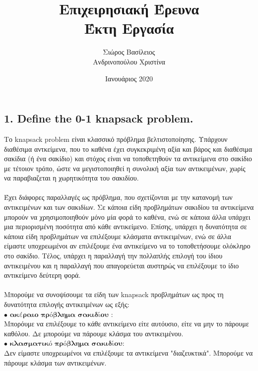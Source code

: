 \documentclass[12pt]{article}
\title{\hugeΑλγοριθμική Επιχειρησιακή Έρευνα\\Έκτη Εργασία}
\author{Σιώρος Βασίλειος\\Ανδρινοπούλου Χριστίνα}
\date{Ιανουάριος 2020}
\begin{document}
\maketitle


\pagebreak


\subsection*{1. Define the 0-1 knapsack problem.}

Το knapsack problem είναι κλασσικό πρόβλημα βελτιστοποίησης. Υπάρχουν διαθέσιμα αντκείμενα, που το καθένα έχει συγκεκριμένη αξία και βάρος και διαθέσιμα σακίδια (ή ένα σακίδιο) και στόχος είναι να τοποθετηθούν τα αντικείμενα στο σακίδιο με τέτοιον τρόπο, ώστε να μεγιστοποιηθεί η συνολική αξία των αντικειμένων, χωρίς να παραβιαζεται η χωρητικότητα του σακιδίου. \\ \\
 
Έχει διάφορες παραλλαγές ως πρόβλημα, που σχετίζονται με την κατανομή των αντικειμένων και των σακιδίων. Σε κάποια είδη προβλημάτων σακιδίου τα αντικείμενα μπορούν να χρησιμοποιηθούν μόνο μία φορά το καθένα, ενώ σε κάποια άλλα υπάρχει μια περιορισμένη ποσότητα από κάθε αντικείμενο. Επίσης, υπάρχει η δυνατότητα σε κάποια είδη προβλημάτων να επιλέξουμε κλάσματα αντικειμένων, ενώ σε άλλα είμαστε υποχρεωμένοι αν επιλέξουμε ένα αντικείμενο να το τοποθετήσουμε ολόκληρο στο σακίδιο. Τέλος, υπάρχει η παραλλαγή την πολλαπλής επιλογή του ίδιου αντικειμένου και η παραλλαγή που απαγορεύεται αυστηρώς να επιλέξουμε το ίδιο αντικείμενο δεύτερη φορά. \\  \\

Μπορούμε να συνοψίσουμε τα είδη των knapsack προβλημάτων ως προς τη δυνατότητα επιλογής αντικειμένων ως εξής: \\
\(\bullet\) \(\textbf{ακέραιο πρόβλημα σακιδίου}\) : \\ 
Μπορόυμε να επιλέξουμε το κάθε αντικείμενο είτε αυτόυσιο, είτε να μην το πάρουμε καθόλου. Δε μπορούμε να πάρουμε κλάσμα του αντικειμένου. \\
\(\bullet\) \(\textbf{κλασματικό πρόβλημα σακιδίου}\): \\
Δεν είμαστε υποχρεωμένοι να επιλέξουμε τα αντικείμενα "διαζευκτικά". Μπορούμε να πάρουμε κλάσμα των αντικειμένων. \\
\end{document}
